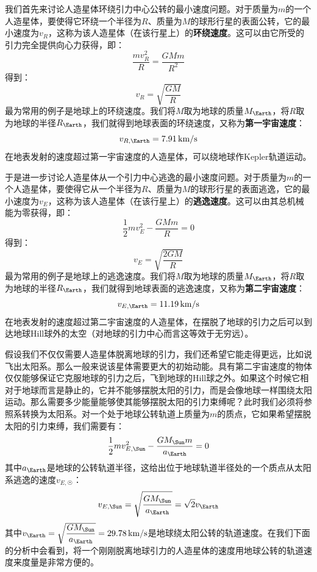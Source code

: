 \documentclass[a4paper,openany]{book}
\begin{document}
我们首先来讨论人造星体环绕引力中心公转的最小速度问题。对于质量为$m$的一个人造星体，要使得它环绕一个半径为$R$、质量为$M$的球形行星的表面公转，它的最小速度为$v_R$，这称为该人造星体（在该行星上）的\textbf{环绕速度}。这可以由它所受的引力完全提供向心力获得，即：
\[
    \frac{mv_R^2}{R} = \frac{GMm}{R^2}
\]
得到：
\[
    \boxed{v_R = \sqrt{\frac{GM}{R}}}
\]
最为常用的例子是地球上的环绕速度。我们将$M$取为地球的质量$M_{\Earth}$，将$R$取为地球的半径$R_{\Earth}$，我们就得到地球表面的环绕速度，又称为\textbf{第一宇宙速度}：
\[
    v_{R,\Earth} = 7.91\,\mathrm{km/s}
\]
在地表发射的速度超过第一宇宙速度的人造星体，可以绕地球作Kepler轨道运动。

于是进一步讨论人造星体从一个引力中心逃逸的最小速度问题。对于质量为$m$的一个人造星体，要使得它从一个半径为$R$、质量为$M$的球形行星的表面逃逸，它的最小速度为$v_E$，这称为该人造星体（在该行星上）的\textbf{逃逸速度}。这可以由其总机械能为零获得，即：
\[
    \frac{1}{2}mv_E^2 - \frac{GMm}{R} = 0
\]
得到：
\[
    \boxed{v_E = \sqrt{\frac{2GM}{R}}}
\]
最为常用的例子是地球上的逃逸速度。我们将$M$取为地球的质量$M_{\Earth}$，将$R$取为地球的半径$R_{\Earth}$，我们就得到地球表面的逃逸速度，又称为\textbf{第二宇宙速度}：
\[
    v_{E,\Earth} = 11.19\,\mathrm{km/s}
\]
在地表发射的速度超过第二宇宙速度的人造星体，在摆脱了地球的引力之后可以到达地球Hill球外的太空（对地球的引力中心而言这等效于无穷远）。

假设我们不仅仅需要人造星体脱离地球的引力，我们还希望它能走得更远，比如说飞出太阳系。那么一般来说该星体需要更大的初始动能。具有第二宇宙速度的物体仅仅能够保证它克服地球的引力之后，飞到地球的Hill球之外。如果这个时候它相对于地球而言是静止的，它并不能够摆脱太阳的引力，而是会像地球一样围绕太阳运动。那么需要多少能量能够使其能够摆脱太阳的引力束缚呢？此时我们必须将参照系转换为太阳系。对一个处于地球公转轨道上质量为$m$的质点，它如果希望摆脱太阳的引力束缚，我们需要有：
\[
    \frac{1}{2}mv_{E,\Sun}^2 - \frac{GM_{\Sun}m}{a_{\Earth}} = 0
\]
其中$a_{\Earth}$是地球的公转轨道半径，这给出位于地球轨道半径处的一个质点从太阳系逃逸的速度$v_{E,\Sun}$：
\[
    v_{E,\Sun} = \sqrt{\frac{GM_{\Sun}}{a_{\Earth}}} = \sqrt{2}v_{\Earth}
\]
其中$v_{\Earth} = \sqrt{\dfrac{GM_{\Sun}}{a_{\Earth}}} = 29.78\,\mathrm{km/s}$是地球绕太阳公转的轨道速度。在我们下面的分析中会看到，将一个刚刚脱离地球引力的人造星体的速度用地球公转的轨道速度来度量是非常方便的。
\end{document}
